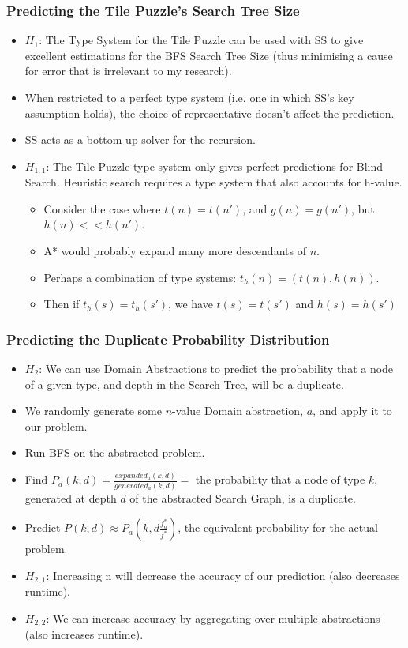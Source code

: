 \documentclass{beamer}
\begin{document}
\begin{frame}
  \frametitle{Predicting the Tile Puzzle's Search Tree Size}
  \begin{itemize}
  \item \(H_1\): The Type System for the Tile Puzzle can be used with SS to give excellent estimations for the BFS Search Tree Size (thus minimising a cause for error that is irrelevant to my research).
  \item When restricted to a perfect type system (i.e. one in which SS's key assumption holds),
    the choice of representative doesn't affect the prediction.
  \item SS acts as a bottom-up solver for the recursion.
  \item \(H_{1,1}\): The Tile Puzzle type system only gives perfect predictions for Blind Search.
    Heuristic search requires a type system that also accounts for h-value.
    \begin{itemize}
    \item Consider the case where \(t(n) = t(n')\), and \(g(n) = g(n')\), but \(h(n) << h(n')\).
    \item A* would probably expand many more descendants of \(n\).
    \item Perhaps a combination of type systems: \(t_h(n) = (t(n), h(n))\).
      \item Then if \(t_{h}(s) = t_{h}(s')\), we have \(t(s) = t(s')\) and \(h(s) = h(s')\)
    \end{itemize}
  \end{itemize}
\end{frame}

\begin{frame}
  \frametitle{Predicting the Duplicate Probability Distribution}
  \begin{itemize}
  \item \(H_2\): We can use Domain Abstractions to predict the probability that a node of a given type,
    and depth in the Search Tree, will be a duplicate.
  \item We randomly generate some \(n\)-value Domain abstraction, \(a\), and apply it to our problem.
  \item Run BFS on the abstracted problem.
  \item Find \(P_{a}(k, d) = \frac{expanded_a(k, d)}{generated_a(k,d)} = \) the probability that a node of type \(k\), generated at depth \(d\) of the abstracted Search Graph, is a duplicate.
  \item Predict \(P(k, d) \approx P_a(k, d \frac{f_a^*}{f^*})\), the equivalent probability for the actual problem.
  \item \(H_{2,1}\): Increasing n will decrease the accuracy of our prediction (also decreases runtime).
  \item \(H_{2,2}\): We can increase accuracy by aggregating over multiple abstractions (also increases runtime).
  \end{itemize}
\end{frame} 
\end{document}
